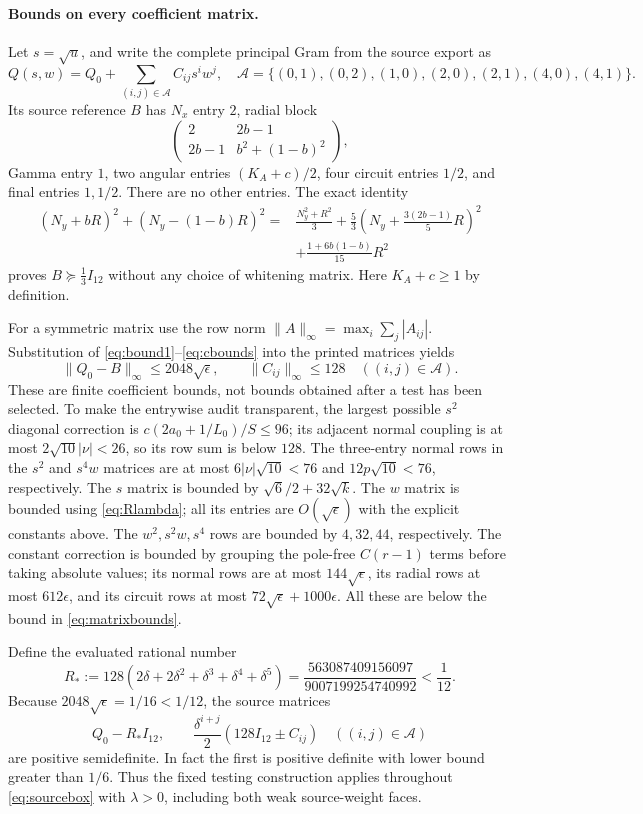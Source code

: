 \paragraph{Bounds on every coefficient matrix.}
Let $s=\sqrt u$, and write the complete principal Gram from the
source export as
\[
 Q(s,w)=Q_0+\sum_{(i,j)\in\mathcal A}C_{ij}s^iw^j,
 \quad
 \mathcal A=\{(0,1),(0,2),(1,0),(2,0),(2,1),(4,0),(4,1)\}.
\]
Its source reference $B$ has $N_x$ entry $2$, radial block
\[
 \begin{pmatrix}2&2b-1\\2b-1&b^2+(1-b)^2\end{pmatrix},
\]
Gamma entry $1$, two angular entries $(K_A+c)/2$, four circuit
entries $1/2$, and final entries $1,1/2$. There are no other
entries. The exact identity
\begin{align*}
 (N_y+bR)^2+(N_y-(1-b)R)^2
 ={}&\frac{N_y^2+R^2}{3}
 +\frac53\left(N_y+\frac{3(2b-1)}5R\right)^2\\
 &+\frac{1+6b(1-b)}{15}R^2
\end{align*}
proves $B\succeq\frac13I_{12}$ without any choice of whitening matrix.
Here $K_A+c\ge1$ by definition.

For a symmetric matrix use the row norm
$\|A\|_\infty=\max_i\sum_j|A_{ij}|$.
Substitution of \eqref{eq:bound1}--\eqref{eq:cbounds} into the
printed matrices yields
\begin{equation}\label{eq:matrixbounds}
 \|Q_0-B\|_\infty\le2048\sqrt\epsilon,\qquad
 \|C_{ij}\|_\infty\le128\quad((i,j)\in\mathcal A).
\end{equation}
These are finite coefficient bounds, not bounds obtained after a test
has been selected. To make the entrywise audit transparent, the
largest possible $s^2$ diagonal correction is
$c(2a_0+1/L_0)/S\le96$; its adjacent normal coupling is at most
$2\sqrt{10}|\nu|<26$, so its row sum is below $128$.
The three-entry normal rows in the $s^2$ and $s^4w$ matrices are at
most $6|\nu|\sqrt{10}<76$ and $12p\sqrt{10}<76$, respectively.
The $s$ matrix is bounded by $\sqrt6/2+32\sqrt{k}$.
The $w$ matrix is bounded using \eqref{eq:Rlambda}; all its entries
are $O(\sqrt\epsilon)$ with the explicit constants above.
The $w^2,s^2w,s^4$ rows are bounded by $4,32,44$, respectively.
The constant correction is bounded by grouping the pole-free
$C(r-1)$ terms before taking absolute values; its normal rows are
at most $144\sqrt\epsilon$, its radial rows at most $612\epsilon$,
and its circuit rows at most $72\sqrt\epsilon+1000\epsilon$.
All these are below the bound in \eqref{eq:matrixbounds}.

Define the evaluated rational number
\[
 R_*:=128(2\delta+2\delta^2+\delta^3+\delta^4+\delta^5)
 =\frac{563087409156097}{9007199254740992}<\frac1{12}.
\]
Because $2048\sqrt\epsilon=1/16<1/12$, the source matrices
\begin{equation}\label{eq:sourcePSDblocks}
 Q_0-R_*I_{12},\qquad
 \frac{\delta^{i+j}}2(128I_{12}\pm C_{ij})
 \quad((i,j)\in\mathcal A)
\end{equation}
are positive semidefinite. In fact the first is positive definite
with lower bound greater than $1/6$. Thus the fixed testing
construction applies throughout \eqref{eq:sourcebox} with
$\lambda>0$, including both weak source-weight faces.

